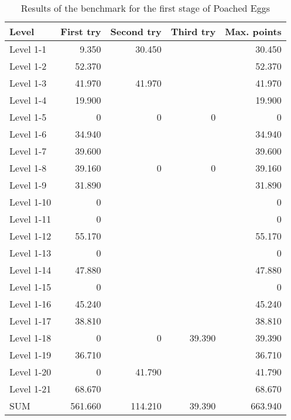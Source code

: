 \begin{table}[h]
	\begin{center}
		\begin{tabular}{l | r r r r}
			Level & First try & Second try & Third try & Max. points \\
			\hline
			\hline
			Level 1-1   &  9.350  &  30.450 &         &   30.450 \\
			\hline
			Level  1-2  &  52.370 &         &         &   52.370 \\
			\hline
			Level  1-3  &  41.970 &  41.970 &         &   41.970 \\
			\hline
			Level  1-4  &  19.900 &         &         &   19.900 \\
			\hline
			Level  1-5  &  0      &  0      &  0      &   0      \\
			\hline
			Level  1-6  &  34.940 &         &         &   34.940 \\
			\hline
			Level  1-7  &  39.600 &         &         &   39.600 \\
			\hline
			Level  1-8  &  39.160 &  0      &  0      &   39.160 \\
			\hline
			Level  1-9  &  31.890 &         &         &   31.890 \\
			\hline
			Level  1-10 &  0      &         &         &   0      \\
			\hline
			Level  1-11 &  0      &         &         &   0      \\
			\hline
			Level  1-12 &  55.170 &         &         &   55.170 \\
			\hline
			Level  1-13 &  0      &         &         &   0      \\
			\hline
			Level  1-14 &  47.880 &         &         &   47.880 \\
			\hline
			Level  1-15 &  0      &         &         &   0      \\
			\hline
			Level  1-16 &  45.240 &         &         &   45.240 \\
			\hline
			Level  1-17 &  38.810 &         &         &   38.810 \\
			\hline
			Level  1-18 &  0      &  0      &  39.390 &   39.390 \\
			\hline
			Level  1-19 &  36.710 &         &         &   36.710 \\
			\hline
			Level  1-20 &  0      &  41.790 &         &   41.790 \\
			\hline
			Level 1-21  &  68.670 &         &         &   68.670 \\
			\hline
			\hline
			SUM         & 561.660 & 114.210 &  39.390 &  663.940
		\end{tabular}
	\end{center}
	\caption{Results of the benchmark for the first stage of Poached Eggs\label{tab:stage1}}
\end{table}


